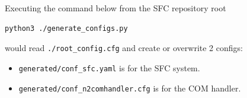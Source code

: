 Executing the command below from the SFC repository root
\begin{verbatim}
python3 ./generate_configs.py
\end{verbatim}
would read \texttt{./root\_config.cfg} and create or overwrite 2 configs:
\begin{itemize}
	\item \texttt{generated/conf\_sfc.yaml} is for the SFC system.
	\item \texttt{generated/conf\_n2comhandler.cfg} is for the COM handler.
\end{itemize}







